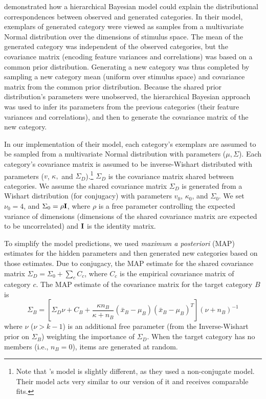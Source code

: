 \documentclass[12pt]{article}
\newcommand\nbcnote[1]{\todo[inline, backgroundcolor = yellow]{\textbf{NBC}: #1}}
\begin{document}
\cite{jern2013probabilistic} demonstrated how a hierarchical Bayesian model could explain the distributional correspondences between observed and generated categories. In their model, exemplars of generated category were viewed as samples from a multivariate Normal distribution over the dimensions of stimulus space. The mean of the generated category was independent of the observed categories, but the covariance matrix (encoding feature variances and correlations) was based on a common prior distribution. Generating a new category was thus completed by sampling a new category mean (uniform over stimulus space) and covariance matrix from the common prior distribution. Because the shared prior distribution's parameters were unobserved, the hierarchical Bayesian approach was used to infer its parameters from the previous categories (their feature variances and correlations), and then to generate the covariance matrix of the new category.

In our implementation of their model, each category's exemplars are assumed to be sampled from a multivariate Normal distribution with parameters ($\mu, \Sigma$). Each category's covariance matrix is assumed to be inverse-Wishart distributed with parameters ($v$, $\kappa,$ and $\Sigma_D$).\footnote{Note that \citet{jern2013probabilistic}'s model is slightly different, as they used a non-conjugate model. Their model acts very similar to our version of it and receives comparable fits.} $\Sigma_D$ is the covariance matrix shared between categories. We assume the shared covariance matrix $\Sigma_D$ is generated from a Wishart distribution (for conjugacy) with parameters $v_0$, $\kappa_0$, and $\Sigma_0$. We set $\nu_0 = 4$, and $\Sigma_0 = \rho {\bf I}$, where $\rho$ is a free parameter controlling the expected variance of dimensions (dimensions of the shared covariance matrix are expected to be uncorrelated) and ${\bf I}$ is the identity matrix.

\nbcnote{check on that $\nu_0 = 4$ business}

To simplify the model predictions, we used {\em maximum a posteriori} (MAP) estimates for the hidden parameters and then generated new categories based on those estimates. Due to conjugacy, the MAP estimate for the shared covariance matrix $\Sigma_D = \Sigma_0 + \sum_c{C_c}$, where $C_c$ is the empirical covariance matrix of category $c$. The MAP estimate of the covariance matrix for the target category $B$ is 
\begin{equation}
\Sigma_B = \left[ \Sigma_D \nu + C_B +
\dfrac
{\kappa n_B}
{\kappa + n_B}
(\bar{x}_B-\mu_B)(\bar{x}_B-\mu_B)^T
\right] (\nu + n_B)^{-1}
\label{eq:Sigma_B}
\end{equation}
%
where $\nu$ ($\nu>k-1$) is an additional free parameter (from the Inverse-Wishart prior on $\Sigma_B$) weighting the importance of $\Sigma_{D}$. When the target category has no members (i.e., $n_B = 0$), items are generated at random.
\end{document}
